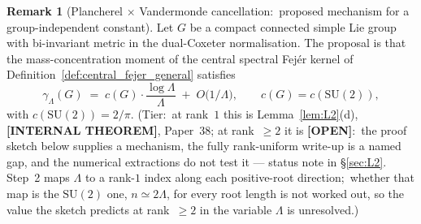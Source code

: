 \documentclass[11pt,a4paper]{article}
\theoremstyle{plain}
\theoremstyle{definition}
\newtheorem{remark}[theorem]{Remark}
\newcommand{\Lammax}{\Lambda}
\newcommand{\SU}{\mathrm{SU}}
\begin{document}
\begin{remark}[Plancherel $\times$ Vandermonde cancellation:\ proposed
mechanism for a group-independent constant]\label{thm:universal_constant_analytical}
Let $G$ be a compact connected simple Lie group with bi-invariant
metric in the dual-Coxeter normalisation. The proposal is that the
mass-concentration moment of the central spectral Fej\'er kernel of
Definition~\ref{def:central_fejer_general} satisfies
\begin{equation}\label{eq:universal_rate_analytical}
   \gamma_\Lammax(G)
   \;=\; c(G) \cdot \frac{\log \Lammax}{\Lammax}
   \;+\; O\!\bigl(1/\Lammax\bigr),
   \qquad c(G) = c(\SU(2)),
\end{equation}
with $c(\SU(2)) = 2/\pi$. (Tier:\ at rank~$1$ this is
Lemma~\ref{lem:L2}(d), \textbf{[INTERNAL THEOREM]}, Paper~38; at
rank~$\ge 2$ it is \textbf{[OPEN]}:\ the proof sketch below supplies a
mechanism, the fully rank-uniform write-up is a named gap, and the
numerical extractions do not test it --- status note in
\S\ref{sec:L2}. Step~2 maps $\Lammax$ to a rank-$1$ index along each
positive-root direction;\ whether that map is the $\SU(2)$ one,
$n \simeq 2\Lammax$, for every root length is not worked out, so the
value the sketch predicts at rank~$\ge 2$ in the variable $\Lammax$ is
unresolved.)
\end{remark}
\end{document}
